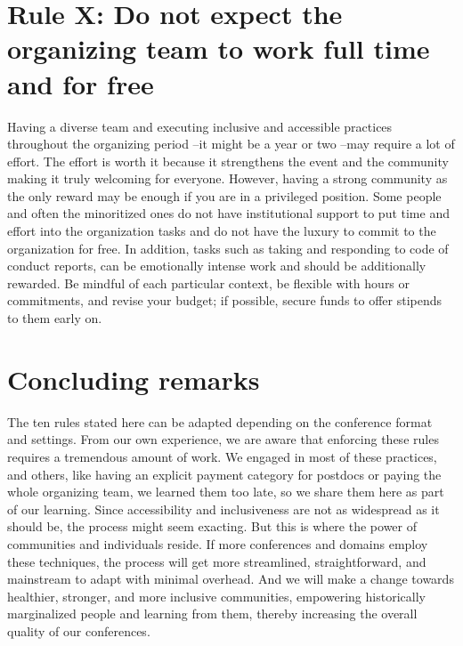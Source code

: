 \documentclass[10pt,letterpaper]{article}
\begin{document}
\section{Rule X: Do not expect the organizing team to work full time and for free}

Having a diverse team and executing inclusive and accessible practices throughout the organizing period --it might be a year or two --may require a lot of effort. The effort is worth it because it strengthens the event and the community making it truly welcoming for everyone. However, having a strong community as the only reward may be enough if you are in a privileged position. Some people and often the minoritized ones do not have institutional support to put time and effort into the organization tasks and do not have the luxury to commit to the organization for free. In addition, tasks such as taking and responding to code of conduct reports, can be emotionally intense work and should be additionally rewarded. Be mindful of each particular context, be flexible with hours or commitments, and revise your budget; if possible, secure funds to offer stipends to them early on. 



\section*{Concluding remarks}

The ten rules stated here can be adapted depending on the conference format and settings. From our own experience, we are aware that enforcing these rules requires a tremendous amount of work. We engaged in most of these practices, and others, like having an explicit payment category for postdocs or paying the whole organizing team, we learned them too late, so we share them here as part of our learning. 
Since accessibility and inclusiveness are not as widespread as it should be, the process might seem exacting. But this is where the power of communities and individuals reside. If more conferences and domains employ these techniques, the process will get more streamlined, straightforward, and mainstream to adapt with minimal overhead. And we will make a change towards healthier, stronger, and more inclusive communities, empowering historically marginalized people and learning from them, thereby increasing the overall quality of our conferences.%
\end{document}

